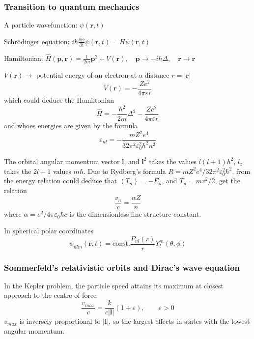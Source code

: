 \documentclass[a4paper,lang=cn,a4paper]{elegantpaper}
\newcommand{\vect}[1]{\boldsymbol{#1}}
\begin{document}
\subsubsection{Transition to quantum mechanics}
A particle wavefunction: $\psi(\vect{r},t)$ 

Schr\"{o}dinger equation: 
$i\hbar\frac{\partial \psi}{\partial t}\psi(\vect{r},t)=H\psi(\vect{r},t)$

Hamiltonian: $\hat{H}(\vect{p}, \vect{r})=\frac{1}{2m}\vect{p}^2+V(\vect{r}),\quad \vect{p}\rightarrow -i\hbar\Delta,\quad \vect{r}\rightarrow \vect{r}$

$V(\vect{r})\rightarrow$ potential energy of an electron at a distance $r=|\vect{r}|$
\begin{equation*}
    V(\vect{r})=-\frac{Ze^2}{4\pi \varepsilon r}
\end{equation*}
which could deduce the Hamiltonian
\begin{equation*}
    \hat{H}=-\frac{\hbar^2}{2m}\Delta^2 - \frac{Ze^2}{4\pi \varepsilon r}
\end{equation*}
and whoes energies are given by the formula
\begin{equation*}
    \varepsilon_{nl}=-\frac{mZ^2 e^4}{32\pi^2 \varepsilon^2_0 \hbar^2 n^2}
\end{equation*}

The orbital angular momentum vector $\vect{l}$, and $\vect{l}^2$ takes 
the values $l(l+1)\hbar^2$, $l_z$ takes the $2l+1$ values $m\hbar$.
Due to Rydberg's formula $R=mZ^2e^4/32\pi^2\varepsilon^2_0 \hbar^2$, 
from the energy relation could deduce that $\left\langle T_n\right\rangle=-E_n$,
and $T_n=mv^2/2$, get the relation
\begin{equation*}
    \frac{v_n}{c}=\frac{\alpha Z}{n}
\end{equation*}
where $\alpha=e^2/4\pi\varepsilon_0\hbar c$ is the dimensionless
fine structure constant. 

In spherical polar coordinates
\begin{equation*}
    \psi_{nlm}(\vect{r},t)=\text{const.}\frac{P_{nl}(r)}{r}Y_l^m(\theta,\phi)
\end{equation*}

\subsubsection{Sommerfeld's relativistic orbits and Dirac's wave equation}
In the Kepler problem, the particle speed attains its maximum at closest
approach to the centre of force
\begin{equation*}
    \frac{v_{max}}{c}=\frac{k}{c|\vect{l}|}(1+\varepsilon),\qquad \varepsilon>0
\end{equation*}
$v_{max}$ is inversely proportional to $|\vect{l}|$, so the largest 
effects in states with the lowest angular momentum.
\end{document}
